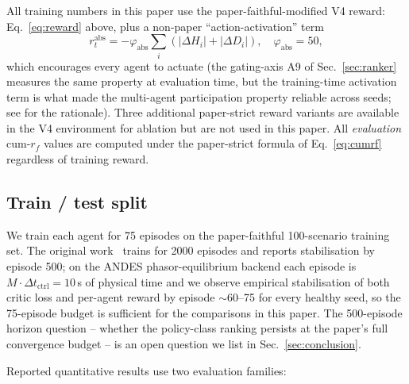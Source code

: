 \documentclass[journal,onecolumn,11pt]{IEEEtran}
\begin{document}
All training numbers in this paper use the paper-faithful-modified
V4 reward: Eq.~\ref{eq:reward} above, plus a non-paper
``action-activation'' term
\begin{equation}\label{eq:phi_abs}
  r_t^{\text{abs}} = -\varphi_{\text{abs}} \sum_i (|\Delta H_i| + |\Delta D_i|),
  \quad \varphi_{\text{abs}} = 50,
\end{equation}
which encourages every agent to actuate (the gating-axis A9 of
Sec.~\ref{sec:ranker} measures the same property at evaluation
time, but the training-time activation term is what made the
multi-agent participation property reliable across seeds; see
\cite[ADR-0002]{wei2026reproduction} for the rationale). Three
additional paper-strict reward variants are available in the V4
environment for ablation but are not used in this paper. All
\emph{evaluation} cum-$r_f$ values are computed under the
paper-strict formula of Eq.~\ref{eq:cumrf} regardless of training
reward.

\subsection{Train / test split}

We train each agent for 75 episodes on the paper-faithful
100-scenario training set. The original work~\cite{yang2023ddic}
trains for 2000 episodes and reports stabilisation by episode 500;
on the ANDES phasor-equilibrium backend each episode is
$M \cdot \Delta t_{\text{ctrl}} = 10$\,s of physical time and we
observe empirical stabilisation of both critic loss and per-agent
reward by episode $\sim$60--75 for every healthy seed, so the
75-episode budget is sufficient for the comparisons in this paper.
The 500-episode horizon question -- whether the policy-class
ranking persists at the paper's full convergence budget -- is an
open question we list in Sec.~\ref{sec:conclusion}.

Reported quantitative results use two evaluation families:
\end{document}

